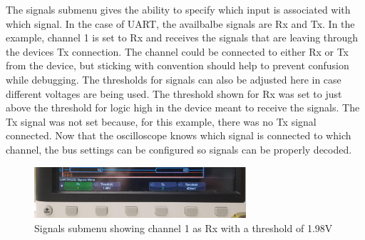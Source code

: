 \documentclass{article}
\begin{document}
  The signals submenu gives the ability to specify which input is associated
  with which signal. In the case of UART, the availbalbe signals are Rx and Tx.
  In the example, channel 1 is set to Rx and receives the signals that are
  leaving through the devices Tx connection. The channel could be connected to
  either Rx or Tx from the device, but sticking with convention should help to
  prevent confusion while debugging. The thresholds for signals can also be
  adjusted here in case different voltages are being used. The threshold shown
  for Rx was set to just above the threshold for logic high in the device meant
  to receive the signals. The Tx signal was not set because, for this example,
  there was no Tx signal connected. Now that the oscilloscope knows which signal
  is connected to which channel, the bus settings can be configured so signals
  can be properly decoded.

  \begin{figure}[h]
    \includegraphics[width=0.7\textwidth]{signals_menu}
    \caption{Signals submenu showing channel 1 as Rx with a threshold of 1.98V}
  \end{figure}
\end{document}
